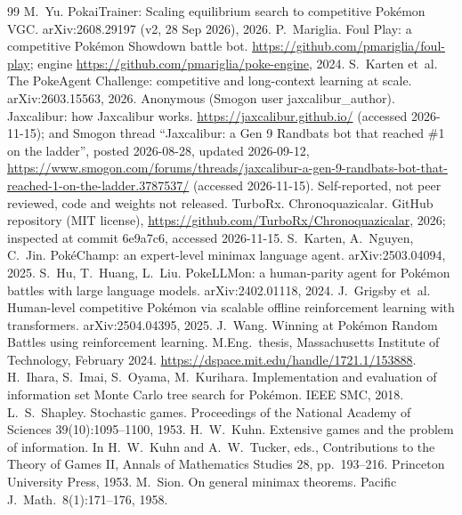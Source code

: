 \documentclass[10pt]{article}
\theoremstyle{plain}
\theoremstyle{definition}
\theoremstyle{remark}
\begin{document}
\begin{thebibliography}{99}\small
\setlength{\itemsep}{0pt}
 M.~Yu. PokaiTrainer: Scaling equilibrium search to competitive Pok\'emon VGC. arXiv:2608.29197 (v2, 28 Sep 2026), 2026.
 P.~Mariglia. Foul Play: a competitive Pok\'emon Showdown battle bot. \url{https://github.com/pmariglia/foul-play}; engine \url{https://github.com/pmariglia/poke-engine}, 2024.
 S.~Karten et~al. The PokeAgent Challenge: competitive and long-context learning at scale. arXiv:2603.15563, 2026.
 Anonymous (Smogon user jaxcalibur\_author). Jaxcalibur: how Jaxcalibur works. \url{https://jaxcalibur.github.io/} (accessed 2026-11-15); and Smogon thread ``Jaxcalibur: a Gen 9 Randbats bot that reached \#1 on the ladder'', posted 2026-08-28, updated 2026-09-12, \url{https://www.smogon.com/forums/threads/jaxcalibur-a-gen-9-randbats-bot-that-reached-1-on-the-ladder.3787537/} (accessed 2026-11-15). Self-reported, not peer reviewed, code and weights not released.
 TurboRx. Chronoquazicalar. GitHub repository (MIT license), \url{https://github.com/TurboRx/Chronoquazicalar}, 2026; inspected at commit 6e9a7c6, accessed 2026-11-15.
 S.~Karten, A.~Nguyen, C.~Jin. Pok\'eChamp: an expert-level minimax language agent. arXiv:2503.04094, 2025.
 S.~Hu, T.~Huang, L.~Liu. PokeLLMon: a human-parity agent for Pok\'emon battles with large language models. arXiv:2402.01118, 2024.
 J.~Grigsby et~al. Human-level competitive Pok\'emon via scalable offline reinforcement learning with transformers. arXiv:2504.04395, 2025.
 J.~Wang. Winning at Pok\'emon Random Battles using reinforcement learning. M.Eng.\ thesis, Massachusetts Institute of Technology, February 2024. \url{https://dspace.mit.edu/handle/1721.1/153888}.
 H.~Ihara, S.~Imai, S.~Oyama, M.~Kurihara. Implementation and evaluation of information set Monte Carlo tree search for Pok\'emon. IEEE SMC, 2018.
 L.~S.~Shapley. Stochastic games. Proceedings of the National Academy of Sciences 39(10):1095--1100, 1953.
 H.~W.~Kuhn. Extensive games and the problem of information. In H.~W.~Kuhn and A.~W.~Tucker, eds., Contributions to the Theory of Games II, Annals of Mathematics Studies 28, pp.~193--216. Princeton University Press, 1953.
 M.~Sion. On general minimax theorems. Pacific J.\ Math.\ 8(1):171--176, 1958.

\end{thebibliography}
\end{document}
